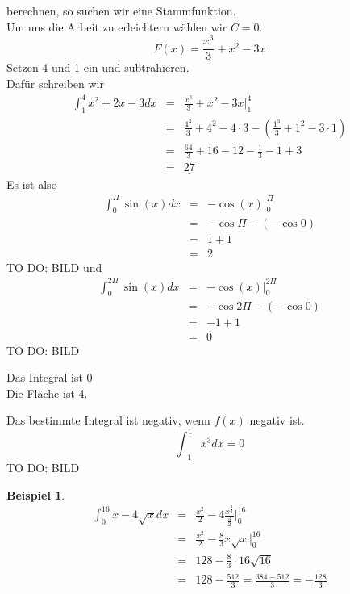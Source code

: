 \documentclass[a4paper,10pt]{report}
\newtheorem{myexample}{Beispiel}
\begin{document}
berechnen, so suchen wir eine Stammfunktion.\\
Um uns die Arbeit zu erleichtern wählen wir $C=0$.
\begin{equation*}
	F(x) = \frac{x^3}{3}+x^2-3x
\end{equation*}
Setzen 4 und 1 ein und subtrahieren.\\
Dafür schreiben wir
\begin{eqnarray*}
	\int_1^4 x^2+2x-3dx &=& \frac{x^3}{3}+x^2-3x \Big|_1^4\\
	&=& \frac{4^3}{3}+4^2-4\cdot 3 -(\frac{1^3}{3}+1^2-3\cdot 1)\\
	&=& \frac{64}{3} + 16 -12 - \frac{1}{3} -1 + 3\\
	&=& \underline{27}
\end{eqnarray*}
Es ist also
\begin{eqnarray*}
	\int_0^\Pi \sin(x)dx &=& -\cos(x) \Big|_0^\Pi\\
	&=& -\cos\Pi-(-\cos0)\\
	&=& 1 + 1\\	
	&=& 2
\end{eqnarray*}
TO DO: BILD
und 
\begin{eqnarray*}
	\int_0^{2\Pi} \sin(x)dx &=& -\cos(x) \Big|_0^{2\Pi}\\
	&=& -\cos2\Pi-(-\cos0)\\
	&=& -1 + 1\\	
	&=& 0
\end{eqnarray*}
TO DO: BILD
\begin{center}
	Das Integral ist 0\\
	Die Fläche ist 4.
\end{center}
Das bestimmte Integral ist negativ, wenn $f(x)$ negativ ist.
\begin{equation*}\int_{-1}^1 x^3dx = 0\end{equation*}
TO DO: BILD
\begin{myexample}
	\begin{eqnarray*}
		\int_0^{16} x-4\sqrt{x}dx &=& \frac{x^2}{2}-4\frac{x^{\frac{3}{2}}}{\frac{3}{2}}\Big|_0^{16}\\
		&=& \frac{x^2}{2} - \frac{8}{3}x \sqrt{x} \Big|_0^{16}\\
		&=& 128 - \frac{8}{3} \cdot 16 \sqrt{16}\\
		&=& 128 - \frac{512}{3} = \frac{384-512}{3} = - \frac{128}{3}
	\end{eqnarray*}
\end{myexample}
\newpage
\end{document}
